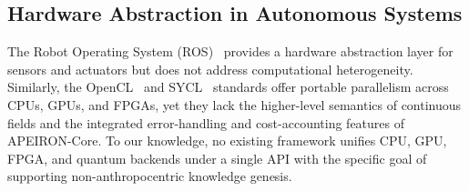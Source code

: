 \subsection{Hardware Abstraction in Autonomous Systems}
The Robot Operating System (ROS)~\cite{ros2024} provides a hardware abstraction layer for sensors and actuators but does not address computational heterogeneity. Similarly, the OpenCL~\cite{opencl2024} and SYCL~\cite{sycl2024} standards offer portable parallelism across CPUs, GPUs, and FPGAs, yet they lack the higher-level semantics of continuous fields and the integrated error-handling and cost-accounting features of APEIRON-Core. To our knowledge, no existing framework unifies CPU, GPU, FPGA, and quantum backends under a single API with the specific goal of supporting non-anthropocentric knowledge genesis.